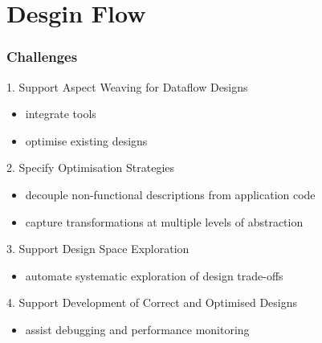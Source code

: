 \section{Desgin Flow}
\begin{frame}
  \frametitle{Challenges}

  \begin{beamerboxesrounded}{1. Support Aspect Weaving for Dataflow Designs}
    \begin{itemize}
    \item integrate tools
    \item optimise existing designs
    \end{itemize}
  \end{beamerboxesrounded}

  \begin{beamerboxesrounded}{2. Specify Optimisation Strategies}
    \begin{itemize}
    \item decouple non-functional descriptions from application code
    \item capture transformations at multiple levels of abstraction
    \end{itemize}
  \end{beamerboxesrounded}

  \begin{beamerboxesrounded}{3. Support Design Space Exploration}
    \begin{itemize}
    \item automate systematic exploration of design trade-offs
    \end{itemize}
  \end{beamerboxesrounded}
  \begin{beamerboxesrounded}{4. Support Development of Correct and Optimised Designs}
    \begin{itemize}
    \item assist debugging and performance monitoring
    \end{itemize}
  \end{beamerboxesrounded}
\end{frame}

